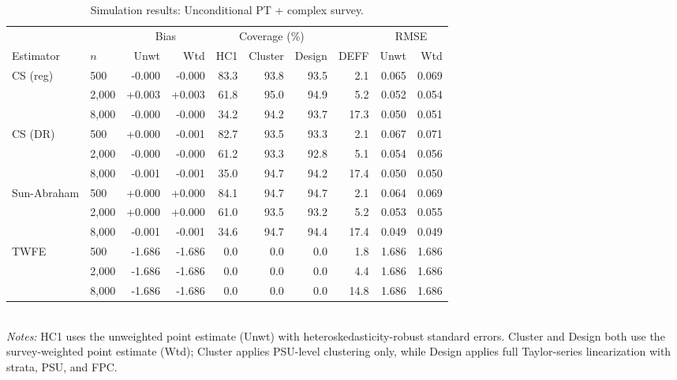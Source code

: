 \begin{table}[ht]
\centering
\small
\caption{Simulation results: Unconditional PT + complex survey.}
\label{tab:sim-s1}
\begin{tabular}{@{}llrrrrrrrr@{}}
\toprule
 & & \multicolumn{2}{c}{Bias} & \multicolumn{3}{c}{Coverage (\%)} &  & \multicolumn{2}{c}{RMSE} \\
\cmidrule(lr){3-4} \cmidrule(lr){5-7} \cmidrule(lr){9-10}
{Estimator} & {$n$} & {Unwt} & {Wtd} & {HC1} & {Cluster} & {Design} & {DEFF} & {Unwt} & {Wtd} \\
\midrule
CS (reg) & 500 & -0.000 & -0.000 & 83.3 & 93.8 & 93.5 & 2.1 & 0.065 & 0.069 \\
 & 2,000 & +0.003 & +0.003 & 61.8 & 95.0 & 94.9 & 5.2 & 0.052 & 0.054 \\
 & 8,000 & -0.000 & -0.000 & 34.2 & 94.2 & 93.7 & 17.3 & 0.050 & 0.051 \\
CS (DR) & 500 & +0.000 & -0.001 & 82.7 & 93.5 & 93.3 & 2.1 & 0.067 & 0.071 \\
 & 2,000 & -0.000 & -0.000 & 61.2 & 93.3 & 92.8 & 5.1 & 0.054 & 0.056 \\
 & 8,000 & -0.001 & -0.001 & 35.0 & 94.7 & 94.2 & 17.4 & 0.050 & 0.050 \\
Sun-Abraham & 500 & +0.000 & +0.000 & 84.1 & 94.7 & 94.7 & 2.1 & 0.064 & 0.069 \\
 & 2,000 & +0.000 & +0.000 & 61.0 & 93.5 & 93.2 & 5.2 & 0.053 & 0.055 \\
 & 8,000 & -0.001 & -0.001 & 34.6 & 94.7 & 94.4 & 17.4 & 0.049 & 0.049 \\
TWFE & 500 & -1.686 & -1.686 & 0.0 & 0.0 & 0.0 & 1.8 & 1.686 & 1.686 \\
 & 2,000 & -1.686 & -1.686 & 0.0 & 0.0 & 0.0 & 4.4 & 1.686 & 1.686 \\
 & 8,000 & -1.686 & -1.686 & 0.0 & 0.0 & 0.0 & 14.8 & 1.686 & 1.686 \\
\bottomrule
\end{tabular}
\\[2pt]\footnotesize \emph{Notes:} HC1 uses the unweighted point estimate (Unwt) with heteroskedasticity-robust standard errors. Cluster and Design both use the survey-weighted point estimate (Wtd); Cluster applies PSU-level clustering only, while Design applies full Taylor-series linearization with strata, PSU, and FPC.
\end{table}
